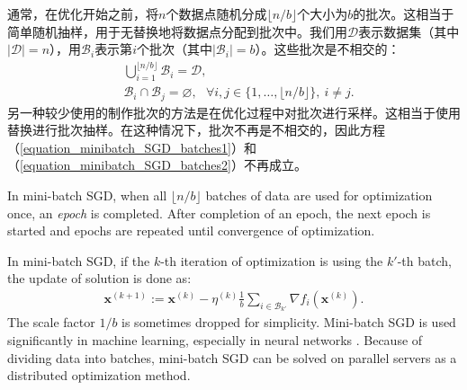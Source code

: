 \documentclass[lang=cn,10pt]{gorgeousnbook}
\numberwithin{equation}{section}%
\numberwithin{figure}{section}%
\begin{document}
通常，在优化开始之前，将$n$个数据点随机分成$\lfloor n / b \rfloor$个大小为$b$的批次。这相当于简单随机抽样，用于无替换地将数据点分配到批次中。我们用$\mathcal{D}$表示数据集（其中$|\mathcal{D}|=n$），用$\mathcal{B}_i$表示第$i$个批次（其中$|\mathcal{B}_i|=b$）。这些批次是不相交的：
\begin{align}
&\bigcup_{i=1}^{\lfloor n / b \rfloor} \mathcal{B}_i = \mathcal{D}, \label{equation_minibatch_SGD_batches1} \\
& \mathcal{B}_i \cap \mathcal{B}_j = \varnothing, ~~~ \forall i,j \in \{1, \dots, \lfloor n / b \rfloor\}, ~ i \neq j. \label{equation_minibatch_SGD_batches2}
\end{align}
另一种较少使用的制作批次的方法是在优化过程中对批次进行采样。这相当于使用替换进行批次抽样。在这种情况下，批次不再是不相交的，因此方程（\ref{equation_minibatch_SGD_batches1}）和（\ref{equation_minibatch_SGD_batches2}）不再成立。

\begin{definition}[Epoch]
In mini-batch SGD, when all $\lfloor n / b \rfloor$ batches of data are used for optimization once, an \textit{epoch} is completed. After completion of an epoch, the next epoch is started and epochs are repeated until convergence of optimization. 
\end{definition}

In mini-batch SGD, if the $k$-th iteration of optimization is using the $k'$-th batch, the update of solution is done as:
\begin{align}\label{equation_minibatch_SGD_step_by_eta}
\boldsymbol{x}^{(k+1)} := \boldsymbol{x}^{(k)} - \eta^{(k)} \frac{1}{b} \sum_{i \in \mathcal{B}_{k'}} \nabla f_i(\boldsymbol{x}^{(k)}).
\end{align}
The scale factor $1/b$ is sometimes dropped for simplicity. 
Mini-batch SGD is used significantly in machine learning, especially in neural networks \cite{bottou1998online,goodfellow2016deep}. Because of dividing data into batches, mini-batch SGD can be solved on parallel servers as a distributed optimization method. 
\end{document}
